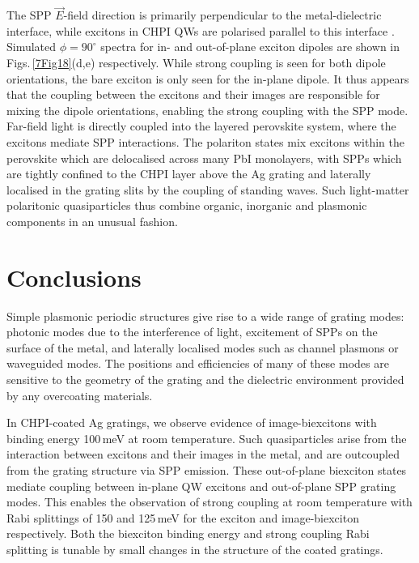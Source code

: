 The SPP $\vec{E}$-field direction is primarily perpendicular to the metal-dielectric interface, while excitons in CHPI QWs are polarised parallel to this interface \cite{Pradeesh2009b, Mitzi2001b}.  Simulated $\phi=90^{\circ}$ spectra for in- and out-of-plane exciton dipoles are shown in Figs.\,\ref{7Fig18}(d,e) respectively. While strong coupling is seen for both dipole orientations, the bare exciton is only seen for the in-plane dipole. It thus appears that the coupling between the excitons and their images are responsible for mixing the dipole orientations, enabling the strong coupling with the SPP mode. Far-field light is directly coupled into the layered perovskite system, where the excitons mediate SPP interactions. The polariton states mix excitons within the perovskite which are delocalised across many PbI monolayers, with SPPs which are tightly confined to the CHPI layer above the Ag grating and laterally localised in the grating slits by the coupling of standing waves. Such light-matter polaritonic quasiparticles thus combine organic, inorganic and plasmonic components in an unusual fashion.


\section{Conclusions}
Simple plasmonic periodic structures give rise to a wide range of grating modes: photonic modes due to the interference of light, excitement of SPPs on the surface of the metal, and laterally localised modes such as channel plasmons or waveguided modes. The positions and efficiencies of many of these modes are sensitive to the geometry of the grating and the dielectric environment provided by any overcoating materials.

In CHPI-coated Ag gratings, we observe evidence of image-biexcitons with binding energy 100\,meV at room temperature. Such quasiparticles arise from the interaction between excitons and their images in the metal, and are outcoupled from the grating structure via SPP emission. These out-of-plane biexciton states mediate coupling between in-plane QW excitons and out-of-plane SPP grating modes. This enables the observation of strong coupling at room temperature with Rabi splittings of 150 and 125\,meV for the exciton and image-biexciton respectively. Both the biexciton binding energy and strong coupling Rabi splitting is tunable by small changes in the structure of the coated gratings.

